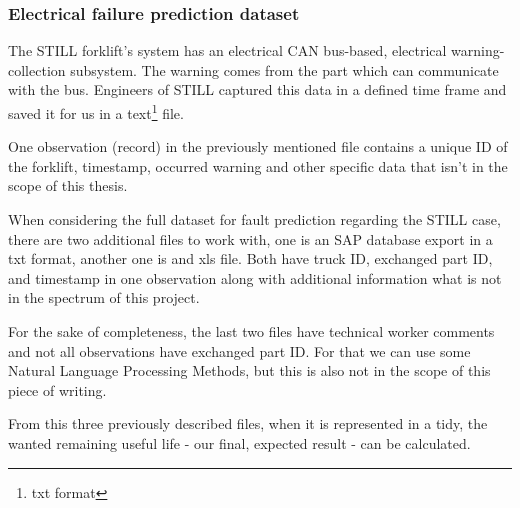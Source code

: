 			\subsubsection{Electrical failure prediction dataset}
The STILL forklift's system has an electrical CAN bus-based, electrical warning-collection subsystem. The warning comes from the part which can communicate with the bus. Engineers of STILL captured this data in a defined time frame and saved it for us in a text\footnote{txt format} file. 

One observation (record) in the previously mentioned file contains a unique ID of the forklift, timestamp, occurred warning and other specific data that isn't in the scope of this thesis.

When considering the full dataset for fault prediction regarding the STILL case, there are two additional files to work with, one is an SAP database export in a txt format, another one is and xls file. Both have truck ID, exchanged part ID, and timestamp in one observation along with additional information what is not in the spectrum of this project.

For the sake of completeness, the last two files have technical worker comments and not all observations have exchanged part ID. For that we can use some Natural Language Processing Methods, but this is also not in the scope of this piece of writing.

From this three previously described files, when it is represented in a tidy, the wanted remaining useful life  - our final, expected result - can be calculated.

